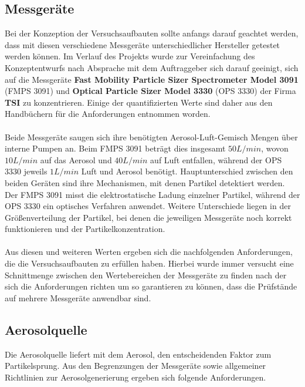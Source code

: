 \subsection{Messger\"{a}te}
Bei der Konzeption der Versuchsaufbauten sollte anfangs darauf geachtet werden, dass mit diesen verschiedene Messger\"{a}te unterschiedlicher Hersteller getestet werden k\"{o}nnen. Im Verlauf des Projekts wurde zur Vereinfachung des Konzeptentwurfs nach Absprache mit dem Auftraggeber sich darauf geeinigt, sich auf die Messger\"{a}te \textbf{Fast Mobility Particle Sizer Spectrometer Model 3091} (FMPS 3091) und \textbf{Optical Particle Sizer Model 3330} (OPS 3330) der Firma \textbf{TSI} zu konzentrieren. Einige der quantifizierten Werte sind daher aus den Handb\"{u}chern f\"{u}r die Anforderungen entnommen worden.
\\\\
Beide Messger\"{a}te saugen sich ihre ben\"{o}tigten Aerosol-Luft-Gemisch Mengen \"{u}ber interne Pumpen an. Beim FMPS 3091 betr\"{a}gt dies insgesamt $50 L/min$, wovon $10 L/min$ auf das Aerosol und $40 L/min$ auf Luft entfallen, w\"{a}hrend der OPS 3330 jeweils $1 L/min$ Luft und Aerosol ben\"{o}tigt. Hauptunterschied zwischen den beiden Ger\"{a}ten sind ihre Mechanismen, mit denen Partikel detektiert werden. Der FMPS 3091 misst die elektrostatische Ladung einzelner Partikel, w\"{a}hrend der OPS 3330 ein optisches Verfahren anwendet. Weitere Unterschiede liegen in der Gr\"{o}{\ss}enverteilung der Partikel, bei denen die jeweiligen Messger\"{a}te noch korrekt funktionieren und der Partikelkonzentration. 
\\\\
Aus diesen und weiteren Werten ergeben sich die nachfolgenden Anforderungen, die die Versuchsaufbauten zu erf\"{u}llen haben. Hierbei wurde immer versucht eine Schnittmenge zwischen den Wertebereichen der Messger\"{a}te zu finden nach der sich die Anforderungen richten um so garantieren zu k\"{o}nnen, dass die Pr\"{u}fst\"{a}nde auf mehrere Messger\"{a}te anwendbar sind.   

\subsection{Aerosolquelle}
Die Aerosolquelle liefert mit dem Aerosol, den entscheidenden Faktor zum Partikelsprung. Aus den Begrenzungen der Messger\"{a}te sowie allgemeiner Richtlinien zur Aerosolgenerierung ergeben sich folgende Anforderungen.

